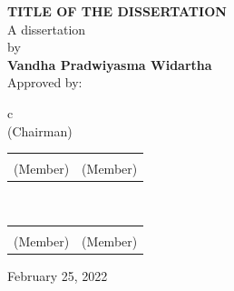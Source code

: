 \documentclass[12pt]{report}
\begin{document}
\begin{center}


{\fontsize{14pt}{14pt}\selectfont \textbf{TITLE OF THE DISSERTATION}} \\[3cm]

{\fontsize{12pt}{12pt}\selectfont A dissertation}\\[6pt]
{\fontsize{12pt}{12pt}\selectfont by}\\[6pt]
{\fontsize{12pt}{12pt}\selectfont \textbf{Vandha Pradwiyasma Widartha}}\\[1.5cm]

{\fontsize{10pt}{10pt}\selectfont Approved by:}\\[1cm]

\begin{tabular}{c}
\makebox[8cm]{\hrulefill} \\[-0.3em]
{\fontsize{10pt}{10pt}\selectfont (Chairman)} \\[1.2cm]

\begin{tabular}{cc}
\makebox[6cm]{\hrulefill} & \makebox[6cm]{\hrulefill} \\[-0.3em]
{\fontsize{10pt}{10pt}\selectfont (Member)} & {\fontsize{10pt}{10pt}\selectfont (Member)} \\
\end{tabular}
\\[1.2cm]

\begin{tabular}{cc}
\makebox[6cm]{\hrulefill} & \makebox[6cm]{\hrulefill} \\[-0.3em]
{\fontsize{10pt}{10pt}\selectfont (Member)} & {\fontsize{10pt}{10pt}\selectfont (Member)} \\
\end{tabular}
\end{tabular}

\vspace{1.5cm}

{\fontsize{12pt}{12pt}\selectfont February 25, 2022}

\vspace*{4cm}

\end{center}
\end{document}
